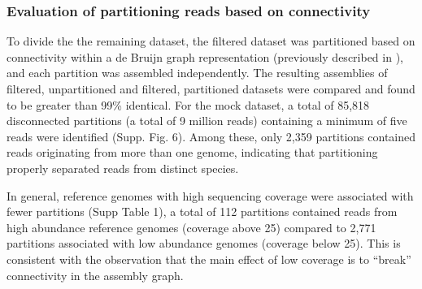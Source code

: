 \documentclass[11pt]{article} %
\begin{document}
\subsubsection{Evaluation of partitioning reads based on connectivity}
To divide the the remaining dataset, the filtered dataset was
partitioned based on connectivity within a de Bruijn graph
representation (previously described in \cite{Pell:2012cq, howeartifacts}),
and each partition was assembled independently.  The resulting
assemblies of filtered, unpartitioned and filtered, partitioned
datasets were compared and found to be greater than 99\% identical.
For the mock dataset, a total of 85,818 disconnected partitions (a
total of 9 million reads) containing a minimum of five reads were
identified (Supp. Fig. 6).  Among these, only 2,359 partitions
contained reads originating from more than one genome, indicating that
partitioning properly separated reads from distinct species.


In general, reference genomes with high sequencing coverage were
associated with fewer partitions (Supp Table 1), a
total of 112 partitions contained reads from high abundance reference
genomes (coverage above 25) compared to 2,771 partitions associated
with low abundance genomes (coverage below 25).  This is consistent
with the observation that the main effect of low coverage is to
``break'' connectivity in the assembly graph.

\end{document}
